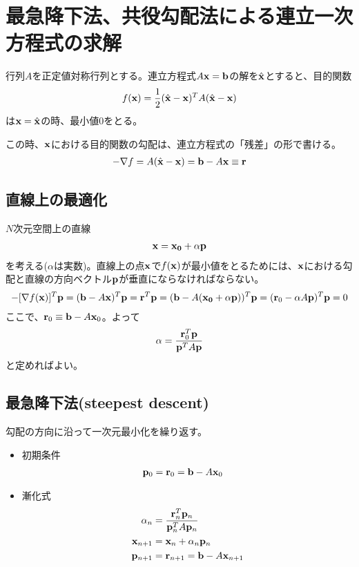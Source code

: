 \documentclass[11pt]{jarticle}
\begin{document}
\section{最急降下法、共役勾配法による連立一次方程式の求解}

行列$A$を正定値対称行列とする。連立方程式$A{\bf x}={\bf b}$の解を$\hat{\bf x}$とすると、目的関数
\begin{align}
f({\bf x}) = \frac{1}{2} (\hat{\bf x} - {\bf x})^T A (\hat{\bf x} - {\bf x})
\end{align}
は${\bf x} = \hat{\bf x}$の時、最小値0をとる。

この時、${\bf x}$における目的関数の勾配は、連立方程式の「残差」の形で書ける。
\begin{align}
-\nabla f = A (\hat{\bf x} - {\bf x}) = {\bf b} - A {\bf x} \equiv {\bf r}
\end{align}

\subsection{直線上の最適化}

$N$次元空間上の直線
\begin{align}
{\bf x} = {\bf x_0} + \alpha {\bf p}
\end{align}
を考える($\alpha$は実数)。直線上の点${\bf x}$で$f({\bf x})$が最小値をとるためには、${\bf x}$における勾配と直線の方向ベクトル${\bf p}$が垂直にならなければならない。
\begin{align}
  -[\nabla f({\bf x})]^T {\bf p} = ({\bf b} - A {\bf x})^T {\bf p} = {\bf r}^T {\bf p} = ({\bf b} - A ({\bf x_0}+\alpha {\bf p}))^T {\bf p} = ({\bf r}_0 - \alpha A {\bf p})^T {\bf p} = 0
  \label{eqn:residual}
\end{align}
ここで、${\bf r}_0 \equiv {\bf b} - A{\bf x}_0$。よって
\begin{align}
\alpha = \frac{{\bf r}_0^T {\bf p}}{{\bf p}^T A {\bf p}}
\end{align}
と定めればよい。

\subsection{最急降下法(steepest descent)}

勾配の方向に沿って一次元最小化を繰り返す。
\begin{itemize}
  \item 初期条件
\begin{align}
  {\bf p}_0 &= {\bf r}_0 = {\bf b} - A {\bf x}_0
\end{align}
  \item 漸化式
\begin{align}
  \alpha_n &= \frac{{\bf r}_n^T {\bf p}_n}{{\bf p}_n^T A {\bf p}_n} \\
  {\bf x}_{n+1} &= {\bf x}_n + \alpha_n {\bf p}_n \\
  {\bf p}_{n+1} &= {\bf r}_{n+1} = {\bf b} - A {\bf x}_{n+1}
\end{align}
\end{itemize}
\end{document}
